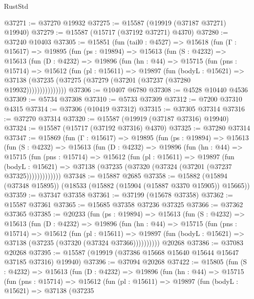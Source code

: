 \begin{lexlean}{RustStd}
\begin{coremodule}
@37271 := @37270 @19932
@37275 := @15587 (@19919 (@37187 @37271) @19940)
@37279 := @15587 (@15717 (@37192 @37271) @4370)
@37280 := @37240 @10403
@37305 := @15851
    (fun (tail0 : @4527) =>
    @15618
      (fun (Γ : @15617) =>
      @19895
        (fun (ps : @19894) =>
        @15613
          (fun (S : @4232) =>
          @15613
            (fun (D : @4232) =>
            @19896
              (fun (hn : @44) =>
              @15715
                (fun (pns : @15714) =>
                @15612
                  (fun (pl : @15611) =>
                  @19897
                    (fun (bodyL : @15621) =>
                    @37138 (@37235 (@37275 (@37279 (@37201 (@37237 (@37280 @19932)))))))))))))))
@37306 := @10407 @6780
@37308 := @4528 @10440 @4536
@37309 := @5734 @37308
@37310 := @5733 @37309
@37312 := @7200 @37310 @4315
@37314 := @37306 (@10419 @37312)
@37315 := @37305 @37314
@37316 := @37270 @37314
@37320 := @15587 (@19919 (@37187 @37316) @19940)
@37324 := @15587 (@15717 (@37192 @37316) @4370)
@37325 := @37280 @37314
@37347 := @15869
    (fun (Γ : @15617) =>
    @19895
      (fun (ps : @19894) =>
      @15613
        (fun (S : @4232) =>
        @15613
          (fun (D : @4232) =>
          @19896
            (fun (hn : @44) =>
            @15715
              (fun (pns : @15714) =>
              @15612
                (fun (pl : @15611) =>
                @19897
                  (fun (bodyL : @15621) =>
                  @37138 (@37235 (@37320 (@37324 (@37201 (@37237 @37325)))))))))))))
@37348 := @15887 @2685
@37358 := @15882 (@15894 (@37348 @15895)) (@18533 (@15882 (@15904 (@15887 @3370 @15905)) @15665))
@37359 := @37347 @37358
@37361 := @37199 (@15678 @37358)
@37362 := @15587 @37361
@37365 := @15685 @37358 @37236 @37325
@37366 := @37362 @37365
@37385 := @20233
    (fun (ps : @19894) =>
    @15613
      (fun (S : @4232) =>
      @15613
        (fun (D : @4232) =>
        @19896
          (fun (hn : @44) =>
          @15715
            (fun (pns : @15714) =>
            @15612
              (fun (pl : @15611) =>
              @19897 (fun (bodyL : @15621) => @37138 (@37235 (@37320 (@37324 @37366))))))))))
    @20268
@37386 := @37083 @20268
@37395 := @15587 (@19919 (@37386 @15668 @15640 @15644 @15647 @37185 @37316) @19940)
@37396 := @37094 @20268
@37422 := @15805
    (fun (S : @4232) =>
    @15613
      (fun (D : @4232) =>
      @19896
        (fun (hn : @44) =>
        @15715
          (fun (pns : @15714) =>
          @15612
            (fun (pl : @15611) =>
            @19897
              (fun (bodyL : @15621) =>
              @37138
                (@37235

\end{coremodule}
\end{lexlean}
